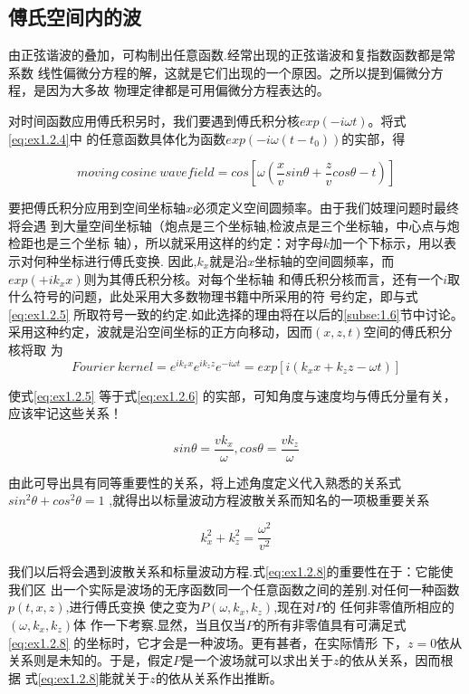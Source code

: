  \subsection{傅氏空间内的波}
 由正弦谐波的叠加，可构制出任意函数.经常出现的正弦谐波和复指数函数都是常系数
 线性偏微分方程的解，这就是它们出现的一个原因。之所以提到偏微分方程，是因为大多故
 物理定律都是可用偏微分方程表达的。


 对时间函数应用傅氏积另时，我们要遇到傅氏积分核$exp(-i\omega t)$。将式\ref{eq:ex1.2.4}中
 的任意函数具体化为函数$exp(-i\omega (t-t_{0}))$的实部，得

  \begin{equation}
  moving\ cosine\ wavefield = cos[\omega(\frac{x}{v}sin\theta+\frac{z}{v}cos\theta-t)]
  \label{eq:ex1.2.5}
  \end{equation}

  要把傅氏积分应用到空间坐标轴$x$必须定义空间圆频率。由于我们妓理问题时最终将会遇
  到大量空间坐标轴（炮点是三个坐标轴,检波点是三个坐标轴，中心点与炮检距也是三个坐标
  轴），所以就采用这样的约定：对字母$k$加一个下标示，用以表示对何种坐标进行傅氏变换.
  因此,$k_{x}$就是沿$x$坐标轴的空间圆频率，而$exp(+ik_{x}x)$则为其傅氏积分核。对每个坐标轴
  和傅氏积分核而言，还有一个$i$取什么符号的问题，此处采用大多数物理书籍中所采用的符
  号约定，即与式\ref{eq:ex1.2.5}
  所取符号一致的约定.如此选择的理由将在以后的\ref{subse:1.6}节中讨论。
  采用这种约定，波就是沿空间坐标的正方向移动，因而$(x,z,t)$空间的傅氏积分核将取
  为
  \begin{equation}
  Fourier\ kernel = 
                e^{ik_{x}x}e^{ik_{z}z}e^{-i\omega t} = exp[i(k_{x}x+k_{z}z-\omega t)]
  \label{eq:ex1.2.6}
  \end{equation}

  使式\ref{eq:ex1.2.5}
  等于式\ref{eq:ex1.2.6}
  的实部，可知角度与速度均与傅氏分量有关，应该牢记这些关系！

  \begin{equation}
  sin\theta=\frac{vk_{x}}{\omega},cos\theta=\frac{vk_{z}}{\omega}
  \label{eq:ex1.2.7}
  \end{equation}

  由此可导出具有同等重要性的关系，将上述角度定义代入熟悉的关系式$sin^{2}\theta+cos^{2}\theta=1$
  ,就得出以标量波动方程波散关系而知名的一项极重要关系

  \begin{equation}
  k^2_{x}+k^2_{z}=\frac{\omega^{2}}{v^{2}}
  \label{eq:ex1.2.8}
  \end{equation}

  我们以后将会遇到波散关系和标量波动方程.式\ref{eq:ex1.2.8}的重要性在于：它能使我们区
  出一个实际是波场的无序函数同一个任意函数之间的差别.对任何一种函数$p(t,x,z)$,进行傅氏变换
  使之变为$P(\omega,k_{x},k_{z})$,现在对$P$的
  任何非零值所相应的$(\omega,k_{x},k_{z})$体
  作一下考察.显然，当且仅当$P$的所有非零值具有可满足式\ref{eq:ex1.2.8}
  的坐标时，它才会是一种波场。更有甚者，在实际情形
  下，$z=0$依从关系则是未知的。于是，假定$P$是一个波场就可以求出关于$z$的依从关系，因而根据
  式\ref{eq:ex1.2.8}能就关于$z$的依从关系作出推断。
  
